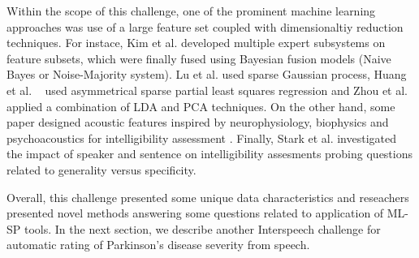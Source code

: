\documentclass{article}
\begin{document}
Within the scope of this challenge, one of the prominent machine learning approaches was use of a large feature set coupled with dimensionaltiy reduction techniques. 
For instace, Kim et al. \cite{kim2013pathology} developed multiple expert subsystems on feature subsets, which were finally fused using Bayesian fusion models (Naive Bayes or Noise-Majority system).
Lu et al. \cite{lu2012predicting} used sparse Gaussian process, Huang et al. ~\cite{huang2012detecting} used asymmetrical sparse partial least squares regression and Zhou et al. \cite{zhou2012automatic} applied a combination of LDA and PCA techniques.
On the other hand, some paper designed acoustic features inspired by neurophysiology, biophysics and psychoacoustics for intelligibility assessment \cite{zhou2012automatic}. 
Finally, Stark et al. \cite{stark2012interspeech} investigated the impact of speaker and sentence on intelligibility assesments probing questions related to generality versus specificity.

Overall, this challenge presented some unique data characteristics and reseachers presented novel methods answering some questions related to application of ML-SP tools.
In the next section, we describe another Interspeech challenge for automatic rating of Parkinson's disease severity from speech. 


\end{document}
